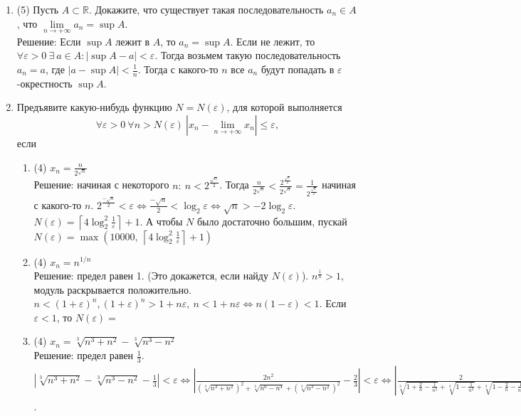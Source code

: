 \documentclass[a4paper]{article}
\def\eps{\varepsilon}
\begin{document}
\begin{enumerate}
	\item (5) Пусть $A\subset\mathbb R$. Докажите, что существует такая последовательность $a_n\in A$, что $\lim\limits_{n\to +\infty} a_n = \sup A$.\\
	Решение: Если $\sup A$ лежит в $A$, то $a_n = \sup A$. Если не лежит, то $\forall \eps > 0\ \exists\ a\in A:|\sup A - a| < \eps$. Тогда возьмем такую последовательность $a_n = a$, где $|a - \sup A| < \frac{1}{n}$. Тогда с какого-то $n$ все $a_n$ будут попадать в $\eps$-окрестность $\sup A$. 
    \item Предъявите какую-нибудь функцию $N = N(\eps)$, для которой выполняется
    \[
        \forall \eps>0\ \forall n> N(\eps)\ |x_n-\lim\limits_{n\to+\infty} x_n|\leq \eps,
    \]
    если
    \begin{enumerate}
        \item (4) $x_n = \frac{n}{2^{\sqrt{n}}}$\\
        Решение: начиная с некоторого $n:\ n < 2^{\frac{\sqrt{n}}{2}}$. Тогда $\frac{n}{2^{\sqrt{n}}} < \frac{2^{\frac{\sqrt{n}}{2}}}{2^{\sqrt{n}}} = \frac{1}{2^{\frac{\sqrt{n}}{2}}}$ начиная с какого-то $n$. $2^{\frac{-\sqrt{n}}{2}} < \eps \Leftrightarrow \frac{-\sqrt{n}}{2} < \log_2\eps \Leftrightarrow \sqrt{n} > -2\log_2\eps$. $N(\eps) = \left \lceil{4\log^2_2\frac{1}{\eps}}\right \rceil + 1$. А чтобы $N$ было достаточно большим, пускай $N(\eps) = \max(10000,\ \left \lceil{4\log^2_2\frac{1}{\eps}}\right \rceil + 1)$
        \item (4) $x_n = n^{1/n}$\\
        Решение: предел равен 1. (Это докажется, если найду $N(\eps)$). $n^{\frac{1}{n}} > 1$, модуль раскрывается положительно. $n < (1 + \eps)^n, (1 + \eps)^n > 1 + n\eps,\ n < 1 + n\eps \Leftrightarrow n(1-\eps) < 1$. Если $\eps < 1$, то $N(\eps) = $ 
        \item (4) $x_n = \sqrt[3]{n^3 + n^2} - \sqrt[3]{n^3 - n^2}$\\
        Решение: предел равен $\frac{1}{3}$. $|\sqrt[3]{n^3 + n^2} - \sqrt[3]{n^3 - n^2} - \frac{1}{3}| < \eps \Leftrightarrow |\frac{2n^2}{(\sqrt[3]{n^3 + n^2})^2 + \sqrt[3]{n^6 - n^4} + (\sqrt[3]{n^3 - n^2})^2} - \frac{2}{3}| < \eps \Leftrightarrow |\frac{2}{\sqrt[3]{1 + \frac{2}{n} - \frac{1}{n^2}} + \sqrt[3]{1 - \frac{1}{n^2}} + \sqrt[3]{1 - \frac{2}{n} - \frac{1}{n^2}}} - \frac{2}{3}| < \eps \Leftrightarrow 2|\frac{1 - \sqrt[3]{1 + \frac{2}{n} - \frac{1}{n^2}} + 1 - \sqrt[3]{1 - \frac{1}{n^2}} + 1 - \sqrt[3]{1 - \frac{2}{n} - \frac{1}{n^2}}}{3(\sqrt[3]{1 + \frac{2}{n} - \frac{1}{n^2}} + \sqrt[3]{1 - \frac{1}{n^2}} + \sqrt[3]{1 - \frac{2}{n} - \frac{1}{n^2}})}| < \eps$.

\end{enumerate}
\end{enumerate}
\end{document}
